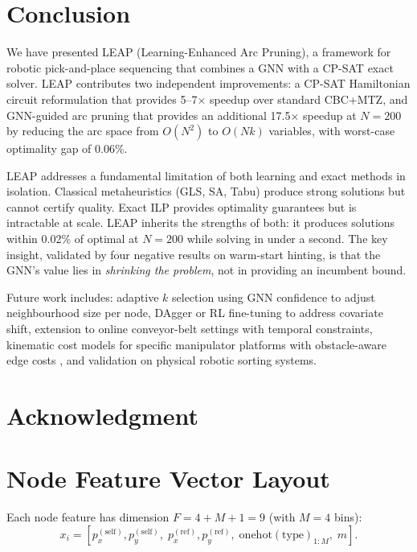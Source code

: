 \documentclass[conference]{IEEEtran}
\begin{document}
\section{Conclusion}\label{sec:conclusion}

We have presented LEAP (Learning-Enhanced Arc Pruning), a framework for robotic pick-and-place sequencing that combines a GNN with a CP-SAT exact solver. LEAP contributes two independent improvements: a CP-SAT Hamiltonian circuit reformulation that provides 5--7$\times$ speedup over standard CBC+MTZ, and GNN-guided arc pruning that provides an additional 17.5$\times$ speedup at $N{=}200$ by reducing the arc space from $O(N^2)$ to $O(Nk)$ variables, with worst-case optimality gap of 0.06\%.

LEAP addresses a fundamental limitation of both learning and exact methods in isolation. Classical metaheuristics (GLS, SA, Tabu) produce strong solutions but cannot certify quality. Exact ILP provides optimality guarantees but is intractable at scale. LEAP inherits the strengths of both: it produces solutions within 0.02\% of optimal at $N{=}200$ while solving in under a second. The key insight, validated by four negative results on warm-start hinting, is that the GNN's value lies in \emph{shrinking the problem}, not in providing an incumbent bound.

Future work includes: adaptive $k$ selection using GNN confidence to adjust neighbourhood size per node, DAgger \cite{ross2011dagger} or RL fine-tuning to address covariate shift, extension to online conveyor-belt settings with temporal constraints, kinematic cost models for specific manipulator platforms \cite{han2019pap} with obstacle-aware edge costs \cite{ojha2025obstacle}, and validation on physical robotic sorting systems.

\section*{Acknowledgment}

\appendices
\section{Node Feature Vector Layout}\label{app:features}

Each node feature has dimension $F = 4 + M + 1 = 9$ (with $M{=}4$ bins):
\begin{equation}
x_i = [p^{(\text{self})}_x, p^{(\text{self})}_y,\; p^{(\text{ref})}_x, p^{(\text{ref})}_y,\; \text{onehot}(\text{type})_{1:M},\; m].
\end{equation}
\end{document}
